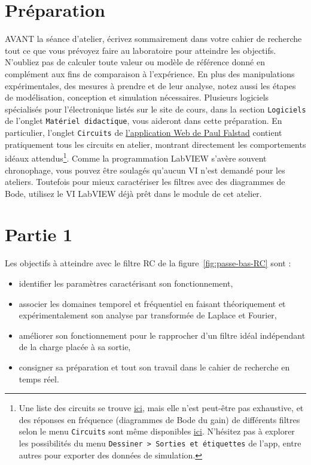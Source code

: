\documentclass[canadien,12pt,oneside,letterpaper]{article}
\begin{document}
\section{Préparation}\label{sec:prep}
\vspace{-3ex}
AVANT la séance d'atelier, écrivez sommairement dans votre cahier de recherche tout ce que vous prévoyez faire au laboratoire pour atteindre les objectifs. N'oubliez pas de calculer toute valeur ou modèle de référence donné en complément aux fins de comparaison à l'expérience. En plus des manipulations expérimentales, des mesures à prendre et de leur analyse, notez aussi les étapes de modélisation, conception et simulation nécessaires. Plusieurs logiciels spécialisés pour l'électronique listés sur le site de cours, dans la section \texttt{Logiciels} de l'onglet \texttt{Matériel didactique}, vous aideront dans cette préparation. En particulier, l'onglet \texttt{Circuits} de \href{https://www.falstad.com/circuit/}{l'application Web de Paul Falstad} contient pratiquement tous les circuits en atelier, montrant directement les comportements idéaux attendus\footnote{Une liste des circuits se trouve \href{https://www.falstad.com/circuit/directions.html}{ici}, mais elle n'est peut-être pas exhaustive, et des réponses en fréquence (diagrammes de Bode du gain) de différents filtres selon le menu \texttt{Circuits} sont même disponibles \href{https://www.falstad.com/afilter/}{ici}. N'hésitez pas à explorer les possibilités du menu \texttt{Dessiner~>~Sorties et étiquettes} de l'app, entre autres pour exporter des données de simulation.}. Comme la programmation LabVIEW s'avère souvent chronophage, vous pouvez être soulagés qu'aucun VI n'est demandé pour les ateliers. Toutefois pour mieux caractériser les filtres avec des diagrammes de Bode, utilisez le VI LabVIEW déjà prêt dans le module de cet atelier.

\section{Partie 1}\label{sec:analyseRC}
Les objectifs à atteindre avec le filtre RC de la figure~\ref{fig:passe-bas-RC} sont :

\begin{itemize}
    \item identifier les paramètres caractérisant son fonctionnement,
    \item associer les domaines temporel et fréquentiel en faisant théoriquement et expérimentalement son analyse par transformée de Laplace et Fourier,
    \item améliorer son fonctionnement pour le rapprocher d'un filtre idéal indépendant de la charge placée à sa sortie,
    \item consigner sa préparation et tout son travail dans le cahier de recherche en temps réel.
\end{itemize}
\end{document}
